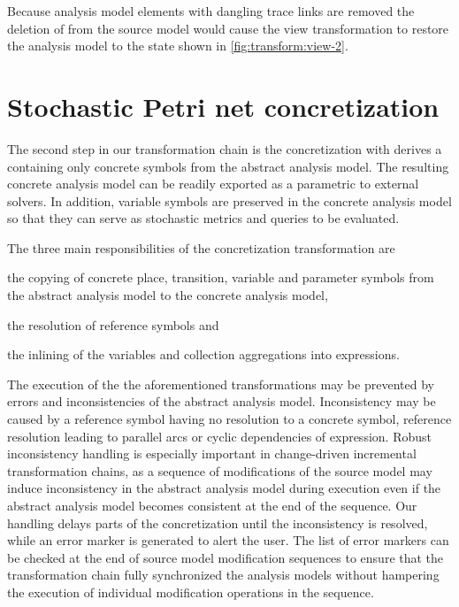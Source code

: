 \begin{runningExample}
  Because analysis model elements with dangling trace links are removed the deletion of  from the source model would cause the view transformation to restore the analysis model to the state shown in \cref{fig:transform:view-2}.
\end{runningExample}

\section{Stochastic Petri net concretization}
\label{chap:transform:concretizer}

The second step in our transformation chain is the concretization with derives a  containing only concrete symbols from the abstract analysis model. The resulting concrete analysis model can be readily exported as a parametric  to external solvers. In addition, variable symbols are preserved in the concrete analysis model so that they can serve as stochastic metrics and queries to be evaluated.

The three main responsibilities of the concretization transformation are
\begin{itemize*}
\item the copying of concrete place, transition, variable and parameter symbols from the abstract analysis model to the concrete analysis model,
\item the resolution of reference symbols and
\item the inlining of the variables and collection aggregations into  expressions.
\end{itemize*}

The execution of the the aforementioned transformations may be prevented by errors and inconsistencies of the abstract analysis model. Inconsistency may be caused by a reference symbol having no resolution to a concrete symbol, reference resolution leading to parallel arcs or cyclic dependencies of expression. Robust inconsistency handling is especially important in change-driven incremental transformation chains, as a sequence of modifications of the source model may induce inconsistency in the abstract analysis model during execution even if the abstract analysis model becomes consistent at the end of the sequence. Our handling delays parts of the concretization until the inconsistency is resolved, while an error marker is generated to alert the user. The list of error markers can be checked at the end of source model modification sequences to ensure that the transformation chain fully synchronized the analysis models without hampering the execution of individual modification operations in the sequence.

